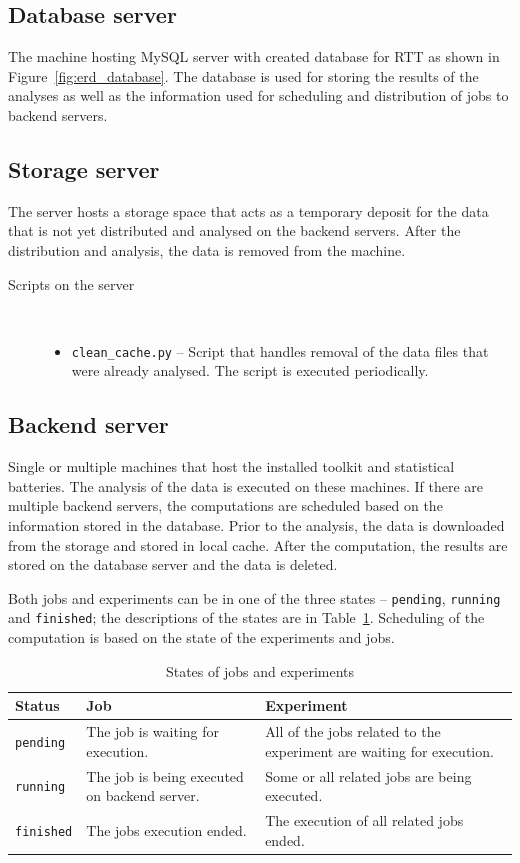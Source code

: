 \documentclass[
  digital,  	%
  color,		%
  oneside,   	%
  12pt,
  nocover,
  notable,
  nolof,
  nolot,
]{fithesis3}
\newenvironment{titlemize}[1]
{
	\begin{description}
	\item[#1]\
	\begin{itemize}
}
{
	\end{itemize}
 	\end{description}
}
\theoremstyle{definition}
\theoremstyle{remark}
\begin{document}
\subsection{Database server}
The machine hosting MySQL server with created database for RTT as shown in Figure~\ref{fig:erd_database}. The database is used for storing the results of the analyses as well as the information used for scheduling and distribution of jobs to backend servers.

\subsection{Storage server}
The server hosts a storage space that acts as a temporary deposit for the data that is not yet distributed and analysed on the backend servers. After the distribution and analysis, the data is removed from the machine.

\begin{titlemize}{Scripts on the server}
\item \texttt{clean\_cache.py} -- Script that handles removal of the data files that were already analysed. The script is executed periodically.
\end{titlemize}

\subsection{Backend server}
Single or multiple machines that host the installed toolkit and statistical batteries. The analysis of the data is executed on these machines. If there are multiple backend servers, the computations are scheduled based on the information stored in the database. Prior to the analysis, the data is downloaded from the storage and stored in local cache. After the computation, the results are stored on the database server and the data is deleted.

Both jobs and experiments can be in one of the three states -- \texttt{pending}, \texttt{running} and \texttt{finished}; the descriptions of the states are in Table~\ref{tab:states_jobs_exps}. Scheduling of the computation is based on the state of the experiments and jobs.

\begin{table}[H]
\begin{nomar}
\centering
\begin{tabular}{@{}lp{5cm}p{5cm}@{}} \toprule
\textbf{Status}   & \textbf{Job} & \textbf{Experiment} \\ \midrule
\texttt{pending}  & The job is waiting for execution. & All of the jobs related to the experiment are waiting for execution. \\ 
\texttt{running}  & The job is being executed on backend server. & Some or all related jobs are being executed. \\ 
\texttt{finished} & The jobs execution ended. & The execution of all \newline related jobs ended. \\ \bottomrule
\end{tabular}
\end{nomar}
\caption{States of jobs and experiments}
\label{tab:states_jobs_exps}
\end{table}
\end{document}
